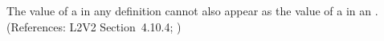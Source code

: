 The value of a   in any \InitialAssignment definition
cannot also appear as the value of a   in an
\AssignmentRule.  (References: L2V2 Section~4.10.4; )
